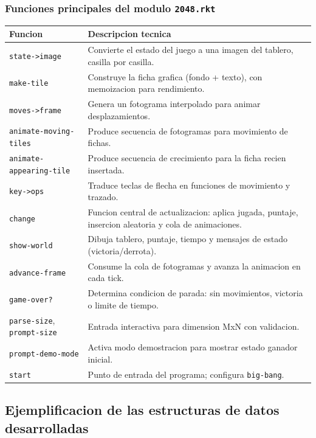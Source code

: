 \documentclass[12pt,a4paper]{article}
\begin{document}
\subsubsection*{Funciones principales del modulo \texttt{2048.rkt}}

\begin{longtable}{p{}p{}}
\toprule
\textbf{Funcion} & \textbf{Descripcion tecnica} \\
\midrule
\endhead
\texttt{state->image} & Convierte el estado del juego a una imagen del tablero, casilla por casilla. \\
\texttt{make-tile} & Construye la ficha grafica (fondo + texto), con memoizacion para rendimiento. \\
\texttt{moves->frame} & Genera un fotograma interpolado para animar desplazamientos. \\
\texttt{animate-moving-tiles} & Produce secuencia de fotogramas para movimiento de fichas. \\
\texttt{animate-appearing-tile} & Produce secuencia de crecimiento para la ficha recien insertada. \\
\texttt{key->ops} & Traduce teclas de flecha en funciones de movimiento y trazado. \\
\texttt{change} & Funcion central de actualizacion: aplica jugada, puntaje, insercion aleatoria y cola de animaciones. \\
\texttt{show-world} & Dibuja tablero, puntaje, tiempo y mensajes de estado (victoria/derrota). \\
\texttt{advance-frame} & Consume la cola de fotogramas y avanza la animacion en cada tick. \\
\texttt{game-over?} & Determina condicion de parada: sin movimientos, victoria o limite de tiempo. \\
\texttt{parse-size}, \texttt{prompt-size} & Entrada interactiva para dimension MxN con validacion. \\
\texttt{prompt-demo-mode} & Activa modo demostracion para mostrar estado ganador inicial. \\
\texttt{start} & Punto de entrada del programa; configura \texttt{big-bang}. \\
\bottomrule
\end{longtable}

\subsection{Ejemplificacion de las estructuras de datos desarrolladas}
\end{document}
